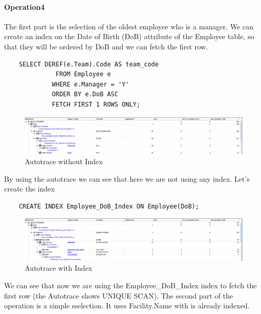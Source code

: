 \paragraph{Operation4} \leavevmode \newline

The first part is the selection of the oldest employee who is a manager. We can create an index on the Date of Birth (DoB) attribute of the Employee table, so that they will be ordered by DoB and we can fetch the first row.

\begin{lstlisting}
    SELECT DEREF(e.Team).Code AS team_code
              FROM Employee e
             WHERE e.Manager = 'Y'
             ORDER BY e.DoB ASC
             FETCH FIRST 1 ROWS ONLY;
\end{lstlisting}

\begin{figure}[H]
    \centering
    \includegraphics[width=\textwidth]{images/OldManNOIndex.png}
    \caption{Autotrace without Index}
\end{figure}

By using the autotrace we can see that here we are not using any index. Let's create the index

\begin{lstlisting}
    CREATE INDEX Employee_DoB_Index ON Employee(DoB);
\end{lstlisting}

\begin{figure}[H]
    \centering
    \includegraphics[width=\textwidth]{images/OldManWithIndex.png}
    \caption{Autotrace with Index}
\end{figure}

We can see that now we are using the Employee\_DoB\_Index index to fetch the first row (the Autotrace shows UNIQUE SCAN). The second part of the operation is a simple sselection. It uses Facility.Name with is already indexed.

